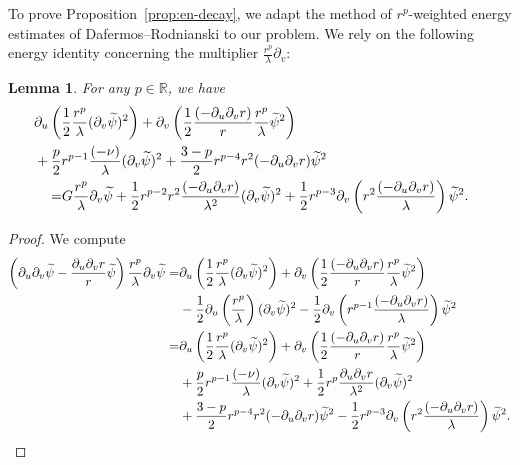 \documentclass[10pt, reqno]{amsart}
\newtheorem{lemma}[theorem]{Lemma}
\theoremstyle{definition}
\theoremstyle{remark}
\theoremstyle{conjecture}
\numberwithin{equation}{section}
\newcommand{\rd}{\partial}
\newcommand{\0}{\emptyset}
\newcommand{\lmb}{\lambda}
\newcommand{\bbR}{\mathbb R}
\newcommand{\dur}{\nu}
\newcommand{\dvr}{\lmb}
\newcommand{\psibg}{\overline{\psi}}				%
\newcommand{\psidf}{\widetilde{\psi}}				%
\begin{document}
To prove Proposition~\ref{prop:en-decay}, we adapt the method of $r^{p}$-weighted energy estimates of Dafermos--Rodnianski \cite{DRNM} to our problem. We rely on the following energy identity concerning the multiplier $\frac{r^{p}}{\dvr} \rd_{v}$:
\begin{lemma} \label{lem:en-id-rp}
For any $p \in \bbR$, we have
\begin{equation} \label{eq:en-id-rp}
\begin{aligned}
& \hskip-2em
	\rd_{u} \left( \frac{1}{2} \frac{r^{p}}{\dvr} (\rd_{v} \psidf)^{2} \right) 
	+ \rd_{v} \left(\frac{1}{2} \frac{(-\rd_{u} \rd_{v} r)}{r} \frac{r^{p}}{\dvr} \psidf^{2} \right) \\
& \hskip-2em
	+ \frac{p}{2} r^{p-1} \frac{(-\dur)}{\dvr} (\rd_{v} \psidf)^{2} 
	+  \frac{3-p}{2} r^{p-4} r^{2} (-\rd_{u} \rd_{v} r)  \psidf^{2} \\
= &	G \frac{r^{p}}{\dvr} \rd_{v} \psidf 
	+ \frac{1}{2} r^{p-2}  r^{2} \frac{(-\rd_{u} \rd_{v} r)}{\dvr^{2}} (\rd_{v} \psidf)^{2} 
	+ \frac{1}{2} r^{p-3} \rd_{v} \left(r^{2} \frac{(-\rd_{u} \rd_{v} r)}{\dvr} \right) \psidf^{2}.
\end{aligned}
\end{equation}
\end{lemma}

\begin{proof}
We compute
\begin{align*}
\left( \rd_{u} \rd_{v} \psidf - \frac{\rd_{u} \rd_{v} r}{r} \psidf \right) \frac{r^{p}}{\dvr} \rd_{v} \psidf
= & \rd_{u} \left( \frac{1}{2} \frac{r^{p}}{\dvr} (\rd_{v} \psidf)^{2} \right) 
	+ \rd_{v} \left(\frac{1}{2} \frac{(-\rd_{u} \rd_{v} r)}{r} \frac{r^{p}}{\dvr} \psidf^{2} \right) \\
& - \frac{1}{2} \rd_{u} \left(\frac{r^{p}}{\dvr} \right) (\rd_{v} \psidf)^{2} 
	- \frac{1}{2} \rd_{v} \left(r^{p-1} \frac{(-\rd_{u} \rd_{v} r)}{\dvr} \right) \psidf^{2} \\
= & \rd_{u} \left( \frac{1}{2} \frac{r^{p}}{\dvr} (\rd_{v} \psidf)^{2} \right) 
	+ \rd_{v} \left(\frac{1}{2} \frac{(-\rd_{u} \rd_{v} r)}{r} \frac{r^{p}}{\dvr} \psidf^{2} \right) \\
& + \frac{p}{2} r^{p-1} \frac{(-\dur)}{\dvr} (\rd_{v} \psidf)^{2} 
 + \frac{1}{2} r^{p} \frac{\rd_{u} \rd_{v} r}{\dvr^{2}} (\rd_{v} \psidf)^{2} \\
& +  \frac{3-p}{2} r^{p-4} r^{2} (-\rd_{u} \rd_{v} r)  \psidf^{2} 
- \frac{1}{2} r^{p-3} \rd_{v} \left(r^{2} \frac{(-\rd_{u} \rd_{v} r)}{\dvr} \right) \psidf^{2}. \qedhere
\end{align*}
\end{proof}
\end{document}
